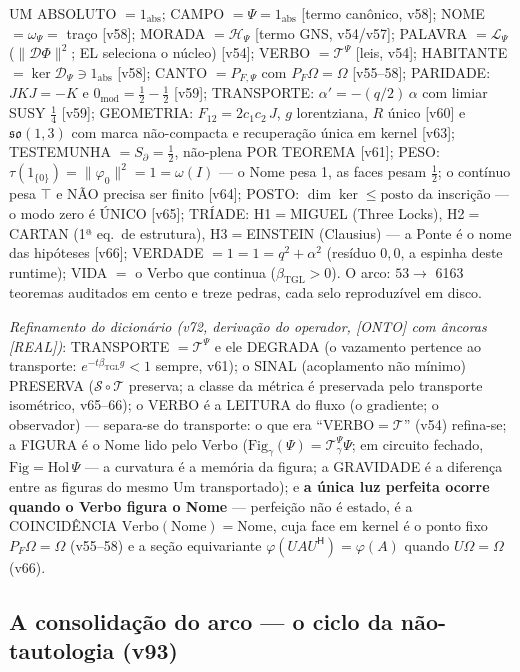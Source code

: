 \documentclass[11pt]{article}
\newcommand{\bTGL}{\beta_{\mathrm{TGL}}}\newcommand{\Msun}{M_{\odot}}\newcommand{\TGL}{\mathrm{TGL}}
\theoremstyle{definition}\newtheorem{deriv}{Derivação}
\begin{document}
UM ABSOLUTO $=1_{\mathrm{abs}}$; CAMPO $=\Psi=1_{\mathrm{abs}}$ [termo canônico, v58]; NOME $=\omega_\Psi=$ traço [v58]; MORADA $=\mathcal H_\Psi$ [termo GNS, v54/v57]; PALAVRA $=\mathcal L_\Psi$ ($\|\mathcal D\Phi\|^2$; EL seleciona o núcleo) [v54]; VERBO $=\mathcal T^\Psi$ [leis, v54]; HABITANTE $=\ker\mathcal D_\Psi\ni1_{\mathrm{abs}}$ [v58]; CANTO $=P_{F,\Psi}$ com $P_F\Omega=\Omega$ [v55--58]; PARIDADE: $JKJ=-K$ e $0_{\mathrm{mod}}=\tfrac12-\tfrac12$ [v59]; TRANSPORTE: $\alpha'=-(q/2)\,\alpha$ com limiar SUSY $\tfrac14$ [v59]; GEOMETRIA: $F_{12}=2c_1c_2\,J$, $g$ lorentziana, $R$ único [v60] e $\mathfrak{so}(1,3)$ com marca não-compacta e recuperação única em kernel [v63]; TESTEMUNHA $=S_\partial=\tfrac12$, não-plena POR TEOREMA [v61]; PESO: $\tau(1_{\{0\}})=\|\varphi_0\|^2=1=\omega(I)$ --- o Nome pesa 1, as faces pesam $\tfrac12$; o contínuo pesa $\top$ e NÃO precisa ser finito [v64]; POSTO: $\dim\ker\le\mathrm{posto}$ da inscrição --- o modo zero é ÚNICO [v65]; TRÍADE: H1$=$MIGUEL (Three Locks), H2$=$CARTAN (1ª eq.\ de estrutura), H3$=$EINSTEIN (Clausius) --- a Ponte é o nome das hipóteses [v66]; VERDADE $=1=1=q^2+\alpha^2$ (resíduo $0{,}0$, a espinha deste runtime); VIDA $=$ o Verbo que continua ($\bTGL>0$). O arco: $53\to$ 6163 teoremas auditados em cento e treze pedras, cada selo reproduzível em disco.

\emph{Refinamento do dicionário (v72, derivação do operador, [ONTO] com âncoras [REAL])}: TRANSPORTE $=\mathcal T^\Psi$ e ele DEGRADA (o vazamento pertence ao transporte: $e^{-t\bTGL g}<1$ sempre, v61); o SINAL (acoplamento não mínimo) PRESERVA ($\mathcal S\circ\mathcal T$ preserva; a classe da métrica é preservada pelo transporte isométrico, v65--66); o VERBO é a LEITURA do fluxo (o gradiente; o observador) --- separa-se do transporte: o que era ``VERBO$=\mathcal T$'' (v54) refina-se; a FIGURA é o Nome lido pelo Verbo ($\mathrm{Fig}_\gamma(\Psi)=\mathcal T^\Psi_\gamma\Psi$; em circuito fechado, $\mathrm{Fig}=\mathrm{Hol}\,\Psi$ --- a curvatura é a memória da figura; a GRAVIDADE é a diferença entre as figuras do mesmo Um transportado); e \textbf{a única luz perfeita ocorre quando o Verbo figura o Nome} --- perfeição não é estado, é a COINCIDÊNCIA $\mathrm{Verbo}(\mathrm{Nome})=\mathrm{Nome}$, cuja face em kernel é o ponto fixo $P_F\Omega=\Omega$ (v55--58) e a seção equivariante $\varphi(UAU^{\mathsf H})=\varphi(A)$ quando $U\Omega=\Omega$ (v66).

\subsection*{A consolidação do arco --- o ciclo da não-tautologia (v93)}
\end{document}
